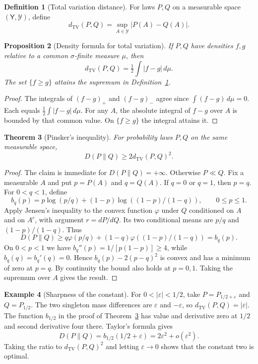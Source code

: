 \documentclass[11pt,oneside]{book}
\newtheorem{theorem}{Theorem}[chapter]
\newtheorem{proposition}[theorem]{Proposition}
\theoremstyle{definition}
\newtheorem{definition}[theorem]{Definition}
\newtheorem{example}[theorem]{Example}
\theoremstyle{remark}
\begin{document}
\begin{definition}[Total variation distance]
\label{def:total-variation-distance}
For laws $P,Q$ on a measurable space $(\mathsf Y,\mathcal Y)$, define
\[
d_{\mathrm{TV}}(P,Q)=\sup_{A\in\mathcal Y}|P(A)-Q(A)|.
\]
\end{definition}

\begin{proposition}[Density formula for total variation]
\label{prop:total-variation-density}
If $P,Q$ have densities $f,g$ relative to a common $\sigma$-finite
measure $\mu$, then
\[
d_{\mathrm{TV}}(P,Q)=\tfrac12\int |f-g|\,d\mu.
\]
The set $\{f\geq g\}$ attains the supremum in
Definition~\ref{def:total-variation-distance}.
\end{proposition}
\begin{proof}
The integrals of $(f-g)_+$ and $(f-g)_-$ agree since
$\int(f-g)\,d\mu=0$. Each equals $\tfrac12\int |f-g|\,d\mu$.
For any $A$, the absolute integral of $f-g$ over $A$ is bounded
by that common value. On $\{f\geq g\}$ the integral attains it.
\end{proof}

\begin{theorem}[Pinsker's inequality]
\label{thm:pinsker}
For probability laws $P,Q$ on the same measurable space,
\[
D(P\|Q)\geq 2d_{\mathrm{TV}}(P,Q)^2.
\]
\end{theorem}
\begin{proof}
The claim is immediate for $D(P\|Q)=+\infty$. Otherwise $P\ll Q$.
Fix a measurable $A$ and put $p=P(A)$ and $q=Q(A)$. If $q=0$
or $q=1$, then $p=q$. For $0<q<1$, define
\[
b_q(p)=p\log(p/q)+(1-p)\log((1-p)/(1-q)),\qquad 0\leq p\leq1 .
\]
Apply Jensen's inequality to the convex function $\varphi$ under
$Q$ conditioned on $A$ and on $A^c$, with argument $r=dP/dQ$.
Its two conditional means are $p/q$ and $(1-p)/(1-q)$. Thus
\[
D(P\|Q)\geq q\varphi(p/q)+(1-q)\varphi((1-p)/(1-q))=b_q(p).
\]
On $0<p<1$ we have $b_q''(p)=1/[p(1-p)]\geq4$, while
$b_q(q)=b_q'(q)=0$. Hence $b_q(p)-2(p-q)^2$ is convex and
has a minimum of zero at $p=q$. By continuity the bound also
holds at $p=0,1$. Taking the supremum over $A$ gives the result.
\end{proof}

\begin{example}[Sharpness of the constant]
\label{ex:pinsker-sharpness}
For $0<|\varepsilon|<1/2$, take $P=P_{1/2+\varepsilon}$ and
$Q=P_{1/2}$. The two singleton mass differences are $\varepsilon$
and $-\varepsilon$, so $d_{\mathrm{TV}}(P,Q)=|\varepsilon|$.
The function $b_{1/2}$ in the proof of Theorem~\ref{thm:pinsker}
has value and derivative zero at $1/2$ and second derivative four
there. Taylor's formula gives
\[
D(P\|Q)=b_{1/2}(1/2+\varepsilon)
=2\varepsilon^2+o(\varepsilon^2).
\]
Taking the ratio to $d_{\mathrm{TV}}(P,Q)^2$ and letting
$\varepsilon\to0$ shows that the constant two is optimal.
\end{example}
\end{document}
